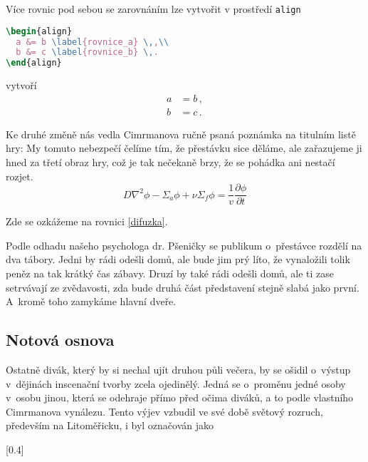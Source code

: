 \documentclass{cygclanek}
\begin{document}
Více rovnic pod sebou se zarovnáním lze vytvořit v prostředí \verb|align|
\begin{lstlisting}[language=TeX]
\begin{align}
  a &= b \label{rovnice_a} \,,\\
  b &= c \label{rovnice_b} \,.
\end{align}
\end{lstlisting}
vytvoří
\begin{align}
  a &= b \label{rovnice_a} \,,\\
  b &= c \label{rovnice_b} \,.
\end{align}








Ke druhé změně \cite{trace_parcs} nás vedla Cimrmanova ručně psaná poznámka na titulním listě hry:
 My tomuto nebezpečí čelíme tím, že
přestávku sice děláme, ale zařazujeme ji hned za třetí obraz hry, což je tak
nečekaně brzy, že se pohádka ani nestačí rozjet. 
\begin{equation}
  D\nabla^2\phi - \Sigma_a\phi + \nu\Sigma_f\phi = \frac{1}{v}\frac{\partial
  \phi}{\partial t}
  \label{difuzka}
\end{equation}

Zde se ozkážeme na rovnici \eqref{difuzka}. 

Podle odhadu našeho psychologa
dr. Pšeničky se publikum o~přestávce rozdělí na dva tábory. Jedni by rádi
odešli domů, ale bude jim prý líto, že vynaložili tolik peněz na tak krátký čas
zábavy. Druzí by také rádi odešli domů, ale ti zase setrvávají ze zvědavosti,
zda bude druhá část představení stejně slabá jako první. A~kromě toho zamykáme
hlavní dveře.


\subsection{Notová osnova}
Ostatně divák, který by si nechal ujít druhou půli večera, by se ošidil
o~výstup v~dějinách inscenační tvorby zcela ojedinělý. Jedná se o~proměnu jedné
osoby v~osobu jinou, která se odehraje přímo před očima diváků, a to podle
vlastního Cimrmanova vynálezu. Tento výjev vzbudil ve své době světový rozruch,
především na Litoměřicku, i byl označován jako 

[0.4]
\end{document}
